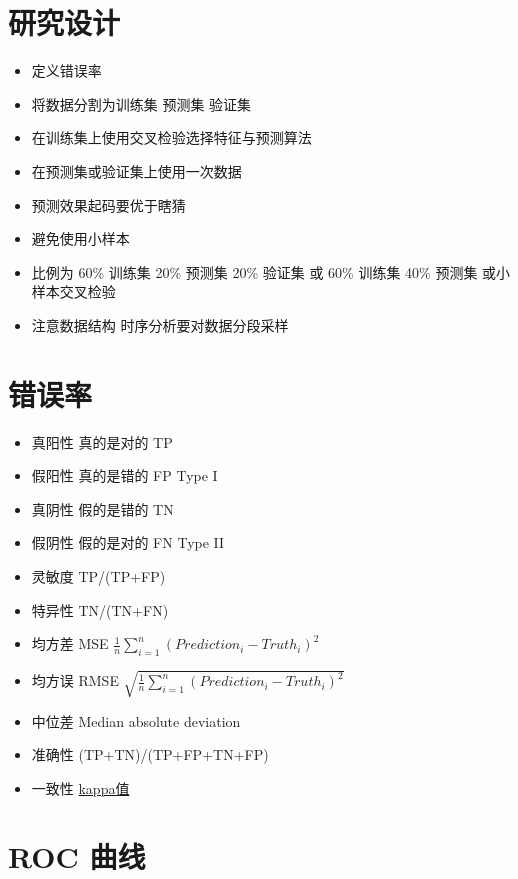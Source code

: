 \documentclass[]{book}
\providecommand{\tightlist}{%
  \setlength{\itemsep}{0pt}\setlength{\parskip}{0pt}}
\begin{document}
\hypertarget{ux7814ux7a76ux8bbeux8ba1}{%
\section{研究设计}\label{ux7814ux7a76ux8bbeux8ba1}}

\begin{itemize}
\tightlist
\item
  定义错误率
\item
  将数据分割为训练集 预测集 验证集
\item
  在训练集上使用交叉检验选择特征与预测算法
\item
  在预测集或验证集上使用一次数据
\item
  预测效果起码要优于瞎猜
\item
  避免使用小样本
\item
  比例为 60\% 训练集 20\% 预测集 20\% 验证集 或 60\% 训练集 40\% 预测集 或小样本交叉检验
\item
  注意数据结构 时序分析要对数据分段采样
\end{itemize}

\hypertarget{ux9519ux8befux7387}{%
\section{错误率}\label{ux9519ux8befux7387}}

\begin{itemize}
\tightlist
\item
  真阳性 真的是对的 TP
\item
  假阳性 真的是错的 FP Type I
\item
  真阴性 假的是错的 TN
\item
  假阴性 假的是对的 FN Type II
\item
  灵敏度 TP/(TP+FP)
\item
  特异性 TN/(TN+FN)
\item
  均方差 MSE \(\frac{1}{n} \sum_{i=1}^n (Prediction_i - Truth_i)^2\)
\item
  均方误 RMSE \(\sqrt{\frac{1}{n} \sum_{i=1}^n(Prediction_i - Truth_i)^2}\)
\item
  中位差 Median absolute deviation
\item
  准确性 (TP+TN)/(TP+FP+TN+FP)
\item
  一致性 \href{https://en.wikipedia.org/wiki/Cohen\%27s_kappa}{kappa值}
\end{itemize}

\hypertarget{roc-ux66f2ux7ebf}{%
\section{ROC 曲线}\label{roc-ux66f2ux7ebf}}
\end{document}
